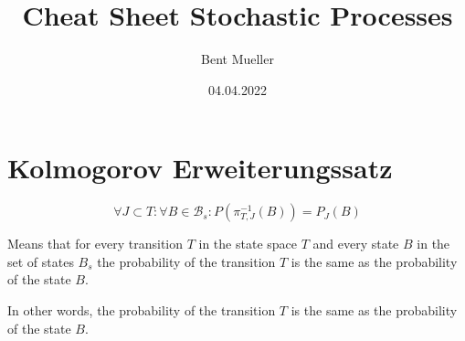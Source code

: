\documentclass[a4paper]{article}
\begin{document}
\title{ \textbf{Cheat Sheet Stochastic Processes} }
\author{Bent Mueller}
\date{04.04.2022}
\maketitle

\section{Kolmogorov Erweiterungssatz}
\[
	\forall J \subset T: \forall B \in \mathcal{B}_s: P(\pi^{-1}_{T, J}(B))
	= P_J (B)
\] 

Means that for every transition $T$ in the state space $T$ and every state $B$ in the set of states $B_s$ the probability of the transition $T$ is the same as the probability of the state $B$.

In other words, the probability of the transition $T$ is the same as the probability of the state $B$.
\end{document}

